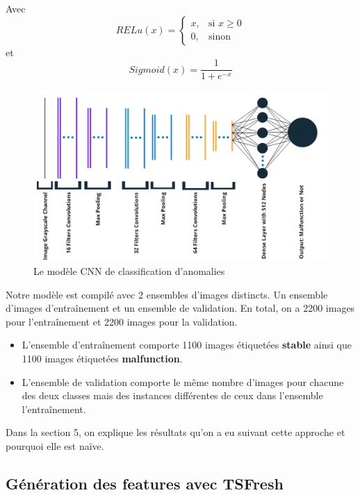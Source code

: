 \documentclass[french]{article}
\theoremstyle{mytheoremstyle}
\theoremstyle{mytheoremstyle}
\theoremstyle{myproblemstyle}
\begin{document}
        Avec 
        \[
        RELu(x) = \begin{cases}
            x,& \text{si } x \ge 0\\
            0,& \text{sinon}
        \end{cases}
        \]
        et
        \[
        Sigmoid(x) = \dfrac{1}{1+e^{-x}}
        \]
        \begin{figure}[H]
            \centering
            \includegraphics[width=\textwidth]{images/cnn.png}
            \caption{Le modèle CNN de classification d'anomalies}
            \label{}
        \end{figure}
        Notre modèle est compilé avec 2 ensembles d'images distincts. Un ensemble d'images d'entraînement et un ensemble de validation. En total, on a 2200 images pour l'entraînement et 2200 images pour la validation.
        \newline
        \begin{itemize}
            \item L'ensemble d'entraînement comporte 1100 images étiquetées \textbf{stable} ainsi que 1100 images étiquetées \textbf{malfunction}.
            \item L'ensemble de validation comporte le même nombre d'images pour chacune des deux classes mais des instances différentes de ceux dans l'ensemble l'entraînement.
        \end{itemize}
        Dans la section 5, on explique les résultats qu'on a eu suivant cette approche et pourquoi elle est naïve.
        \subsection{Génération des features avec TSFresh}
\end{document}
